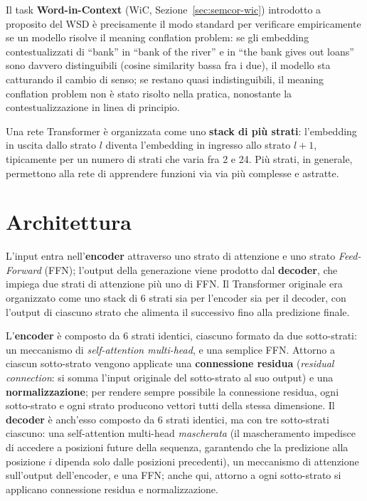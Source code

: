\documentclass[11pt,a4paper]{report}
\begin{document}
Il task \textbf{Word-in-Context} (WiC, Sezione~\ref{sec:semcor-wic}) introdotto a proposito del WSD è precisamente il modo standard per verificare empiricamente se un modello risolve il meaning conflation problem: se gli embedding contestualizzati di ``bank'' in ``bank of the river'' e in ``the bank gives out loans'' sono davvero distinguibili (cosine similarity bassa fra i due), il modello sta catturando il cambio di senso; se restano quasi indistinguibili, il meaning conflation problem non è stato risolto nella pratica, nonostante la contestualizzazione in linea di principio.

Una rete Transformer è organizzata come uno \textbf{stack di più strati}: l'embedding in uscita dallo strato $l$ diventa l'embedding in ingresso allo strato $l+1$, tipicamente per un numero di strati che varia fra 2 e 24. Più strati, in generale, permettono alla rete di apprendere funzioni via via più complesse e astratte.

\section{Architettura}

L'input entra nell'\textbf{encoder} attraverso uno strato di attenzione e uno strato \emph{Feed-Forward} (FFN); l'output della generazione viene prodotto dal \textbf{decoder}, che impiega due strati di attenzione più uno di FFN. Il Transformer originale era organizzato come uno stack di 6 strati sia per l'encoder sia per il decoder, con l'output di ciascuno strato che alimenta il successivo fino alla predizione finale.

L'\textbf{encoder} è composto da 6 strati identici, ciascuno formato da due sotto-strati: un meccanismo di \emph{self-attention multi-head}, e una semplice FFN. Attorno a ciascun sotto-strato vengono applicate una \textbf{connessione residua} (\emph{residual connection}: si somma l'input originale del sotto-strato al suo output) e una \textbf{normalizzazione}; per rendere sempre possibile la connessione residua, ogni sotto-strato e ogni strato producono vettori tutti della stessa dimensione. Il \textbf{decoder} è anch'esso composto da 6 strati identici, ma con tre sotto-strati ciascuno: una self-attention multi-head \emph{mascherata} (il mascheramento impedisce di accedere a posizioni future della sequenza, garantendo che la predizione alla posizione $i$ dipenda solo dalle posizioni precedenti), un meccanismo di attenzione sull'output dell'encoder, e una FFN; anche qui, attorno a ogni sotto-strato si applicano connessione residua e normalizzazione.
\end{document}
